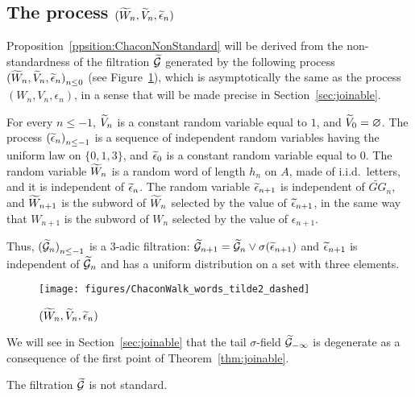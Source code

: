 \documentclass[12pt,a4paper]{article}
\begin{document}
\subsection{The process $(\widetilde{W}_n, \widetilde{V}_n, \widetilde{\epsilon}_n)$}


Proposition~\ref{ppsition:ChaconNonStandard} will be derived from the 
non-standardness of the filtration $\widetilde{\mathcal{G}}$ generated by 
the following process ${(\widetilde{W}_n, \widetilde{V}_n, \widetilde{\epsilon}_n)}_{n \leq 0}$ 
(see Figure~\ref{fig:tildeWn}), 
which is asymptotically the same as the process $(W_n, V_n, \epsilon_n)$, 
in a sense that will be made precise in Section~\ref{sec:joinable}.


For every $n \leq -1$, $\widetilde{V}_n$ is a constant random variable equal to $1$, 
and $\widetilde{V}_0=\varnothing$. 
The process ${(\widetilde{\epsilon}_n)}_{n \leq -1}$ is a sequence of independent random 
variables having the uniform law on $\{0,1,3\}$, and $\widetilde{\epsilon}_0$ is a 
constant random variable equal to $0$. 
The random variable $\widetilde{W}_n$ is a random word of length $h_n$ on $A$, 
made of i.i.d.\ letters, and  it is 
independent of $\widetilde{\epsilon}_n$. 
The random variable $\widetilde{\epsilon}_{n+1}$ is independent of $\widetilde{GG}_n$, and 
$\widetilde{W}_{n+1}$ is the subword of $\widetilde{W}_n$ selected by the value of $\widetilde{\epsilon}_{n+1}$, 
in the same way that $W_{n+1}$ is the subword of $W_n$ selected by the value of $\epsilon_{n+1}$.

Thus, ${(\widetilde{\mathcal{G}}_n)}_{n \leq -1}$ is a $3$-adic filtration: 
$\widetilde{\mathcal{G}}_{n+1} = \widetilde{\mathcal{G}}_n \vee \sigma(\widetilde{\epsilon}_{n+1})$ and 
$\widetilde{\epsilon}_{n+1}$ is independent of $\widetilde{\mathcal{G}}_n$ and has a uniform distribution 
on a set with three elements. 


\begin{figure}[!h]
\centering
	\texttt{[image: figures/ChaconWalk\_words\_tilde2\_dashed]}
\caption{$(\widetilde{W}_n, \widetilde{V}_n, \widetilde{\epsilon}_n)$}
\label{fig:tildeWn}
\end{figure}

We will see in Section~\ref{sec:joinable} that the tail $\sigma$-field 
$\widetilde{\mathcal{G}}_{-\infty}$ is degenerate as a consequence of the first point of Theorem~\ref{thm:joinable}.

\begin{ppsition}\label{ppsition:tildGnonstandard}
The filtration $\widetilde{\mathcal{G}}$ is not standard. 
\end{ppsition}
\end{document}
